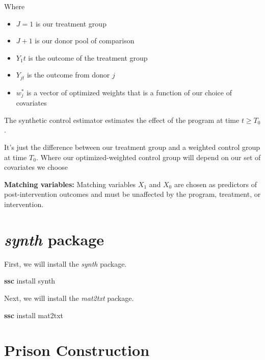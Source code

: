 \documentclass[
]{book}
\newenvironment{Shaded}{\begin{snugshade}}{\end{snugshade}}
\newcommand{\KeywordTok}[1]{\textcolor[rgb]{0.13,0.29,0.53}{\textbf{#1}}}
\newcommand{\NormalTok}[1]{#1}
\providecommand{\tightlist}{%
  \setlength{\itemsep}{0pt}\setlength{\parskip}{0pt}}
\begin{document}
Where

\begin{itemize}
\tightlist
\item
  \(J=1\) is our treatment group
\item
  \(J+1\) is our donor pool of comparison
\item
  \(Y_1t\) is the outcome of the treatment group
\item
  \(Y_{jt}\) is the outcome from donor \(j\)
\item
  \(w^*_j\) is a vector of optimized weights that is a function of our choice of covariates
\end{itemize}

The synthetic control estimator estimates the effect of the program at time \(t \geq T_{0}\).

It's just the difference between our treatment group and a weighted control group at time \(T_{0}\). Where our optimized-weighted control group will depend on our set of covariates we choose

\textbf{Matching variables:} Matching variables \(X_1\) and \(X_0\) are chosen as predictors of post-intervention outcomes and must be unaffected by the program, treatment, or intervention.

\section{\texorpdfstring{\emph{synth} package}{synth package}}\label{synth-package}

First, we will install the \emph{synth} package.

\begin{Shaded}
\begin{Highlighting}[]
\KeywordTok{ssc}\NormalTok{ install synth }
\end{Highlighting}
\end{Shaded}

Next, we will install the \emph{mat2txt} package.

\begin{Shaded}
\begin{Highlighting}[]
\KeywordTok{ssc}\NormalTok{ install mat2txt}
\end{Highlighting}
\end{Shaded}

\section{Prison Construction}\label{prison-construction}
\end{document}
